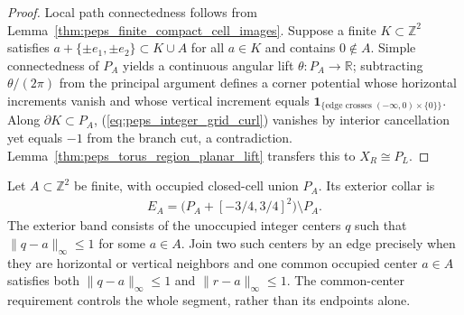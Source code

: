 \begin{proof}\leanok
    Local path connectedness follows from Lemma~\ref{thm:peps_finite_compact_cell_images}. Suppose a finite $K\subset\mathbb Z^2$ satisfies $a+\{\pm e_1,\pm e_2\}\subset K\cup A$ for all $a\in K$ and contains $0\notin A$. Simple connectedness of $P_A$ yields a continuous angular lift $\theta:P_A\to\mathbb R$; subtracting $\theta/(2\pi)$ from the principal argument defines a corner potential whose horizontal increments vanish and whose vertical increment equals $\mathbf 1_{\{\text{edge crosses }(-\infty,0)\times\{0\}\}}$. Along $\partial K\subset P_A$, (\ref{eq:peps_integer_grid_curl}) vanishes by interior cancellation yet equals $-1$ from the branch cut, a contradiction. Lemma~\ref{thm:peps_torus_region_planar_lift} transfers this to $X_R\cong P_L$.
\end{proof}

\begin{definition}%
    \label{def:peps_integer_exterior_collar_graph}
    \leanok
    Let $A\subset\mathbb Z^2$ be finite, with occupied closed-cell union
    $P_A$. Its exterior collar is
    \begin{align}
        E_A=\bigl(P_A+[-3/4,3/4]^2\bigr)\setminus P_A.
    \end{align}
    The exterior band consists of the unoccupied integer centers $q$
    such that $\|q-a\|_\infty\leq1$ for some $a\in A$.
    Join two such centers by an edge precisely when they are horizontal
    or vertical neighbors and one common occupied center $a\in A$
    satisfies both $\|q-a\|_\infty\leq1$ and $\|r-a\|_\infty\leq1$.
    The common-center requirement controls the whole segment, rather
    than its endpoints alone.
\end{definition}

